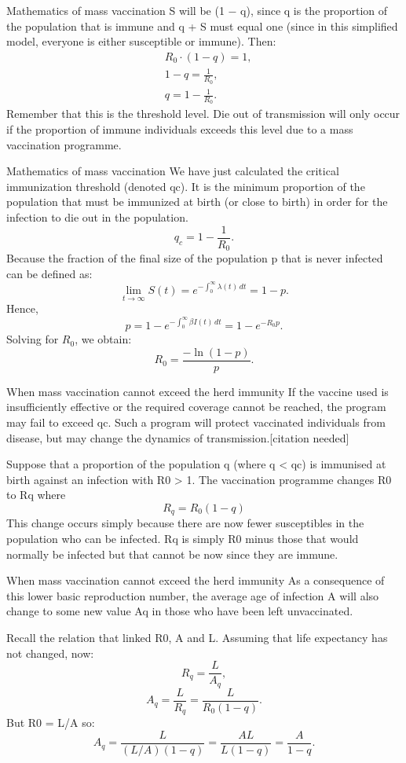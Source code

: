 \documentclass[
  notheorems,
  aspectratio=54,
]{beamer}
\begin{document}
\begin{frame}{Mathematics of mass vaccination}
S will be (1 − q), since q is the proportion of the population that is immune and q + S must equal one (since in this simplified model, everyone is either susceptible or immune). Then:
$${\displaystyle {\begin{aligned}&R_{0}\cdot (1-q)=1,\\[6pt]&1-q={\frac {1}{R_{0}}},\\[6pt]&q=1-{\frac {1}{R_{0}}}.\end{aligned}}}$$
  Remember that this is the threshold level. Die out of transmission will only occur if the proportion of immune individuals exceeds this level due to a mass vaccination programme.
\end{frame}

\begin{frame}{Mathematics of mass vaccination}
  We have just calculated the critical immunization threshold (denoted qc). It is the minimum proportion of the population that must be immunized at birth (or close to birth) in order for the infection to die out in the population.
$${\displaystyle q_{c}=1-{\frac {1}{R_{0}}}.}$$
Because the fraction of the final size of the population p that is never infected can be defined as:
$${\displaystyle \lim _{t\to \infty }S(t)=e^{-\int _{0}^{\infty }\lambda (t)\,dt}=1-p.}$$
Hence,
$${\displaystyle p=1-e^{-\int _{0}^{\infty }\beta I(t)\,dt}=1-e^{-R_{0}p}.}$$
Solving for 
${\displaystyle R_{0}}$, we obtain:
$${\displaystyle R_{0}={\frac {-\ln(1-p)}{p}}.}$$
\end{frame}

\begin{frame}{When mass vaccination cannot exceed the herd immunity}
  If the vaccine used is insufficiently effective or the required coverage cannot be reached, the program may fail to exceed qc. Such a program will protect vaccinated individuals from disease, but may change the dynamics of transmission.[citation needed]

Suppose that a proportion of the population q (where q < qc) is immunised at birth against an infection with R0 > 1. The vaccination programme changes R0 to Rq where
$${\displaystyle R_{q}=R_{0}(1-q)}$$
This change occurs simply because there are now fewer susceptibles in the population who can be infected. Rq is simply R0 minus those that would normally be infected but that cannot be now since they are immune.
\end{frame}

\begin{frame}{When mass vaccination cannot exceed the herd immunity}
  As a consequence of this lower basic reproduction number, the average age of infection A will also change to some new value Aq in those who have been left unvaccinated.

Recall the relation that linked R0, A and L. Assuming that life expectancy has not changed, now:
$${\displaystyle R_{q}={\frac {L}{A_{q}}},}$$
$${\displaystyle A_{q}={\frac {L}{R_{q}}}={\frac {L}{R_{0}(1-q)}}.}$$
But R0 = L/A so:
$${\displaystyle A_{q}={\frac {L}{(L/A)(1-q)}}={\frac {AL}{L(1-q)}}={\frac {A}{1-q}}.}$$
\end{frame}
\end{document}
